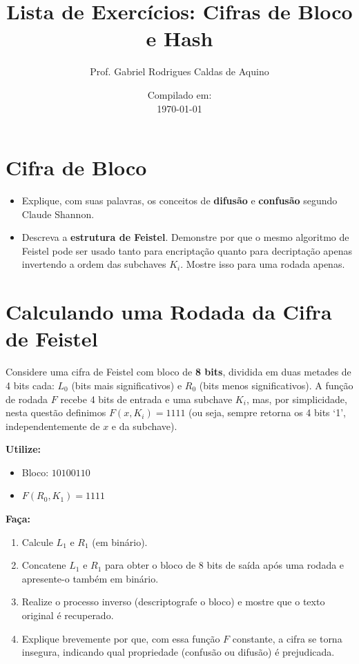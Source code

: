 \title{Lista de Exercícios: Cifras de Bloco e Hash}
\author{Prof. Gabriel Rodrigues Caldas de Aquino}
\date{Compilado em: \\ \today}



\maketitle

\section{Cifra de Bloco}

\begin{itemize}
    \item Explique, com suas palavras, os conceitos de \textbf{difusão} e \textbf{confusão} segundo Claude Shannon.
    \item Descreva a \textbf{estrutura de Feistel}. Demonstre por que o mesmo algoritmo de Feistel pode ser usado tanto para encriptação quanto para decriptação apenas invertendo a ordem das subchaves $K_i$. Mostre isso para uma rodada apenas.
\end{itemize}

\section{Calculando uma Rodada da Cifra de Feistel}

Considere uma cifra de Feistel com bloco de \textbf{8 bits}, dividida em duas metades de 4 bits cada: $L_0$ (bits mais significativos) e $R_0$ (bits menos significativos).
A função de rodada $F$ recebe 4 bits de entrada e uma subchave $K_i$, mas, por simplicidade, nesta questão definimos $F(x, K_i) = 1111$ (ou seja, sempre retorna os 4 bits ‘1’, independentemente de $x$ e da subchave).

\textbf{Utilize:}
\begin{itemize}
    \item Bloco: $10100110$
    \item $F(R_0, K_1) = 1111$
\end{itemize}

\textbf{Faça:}
\begin{enumerate}
    \item Calcule $L_1$ e $R_1$ (em binário).
    \item Concatene $L_1$ e $R_1$ para obter o bloco de 8 bits de saída após uma rodada e apresente-o também em binário.
    \item Realize o processo inverso (descriptografe o bloco) e mostre que o texto original é recuperado.
    \item Explique brevemente por que, com essa função $F$ constante, a cifra se torna insegura, indicando qual propriedade (confusão ou difusão) é prejudicada.
\end{enumerate}

